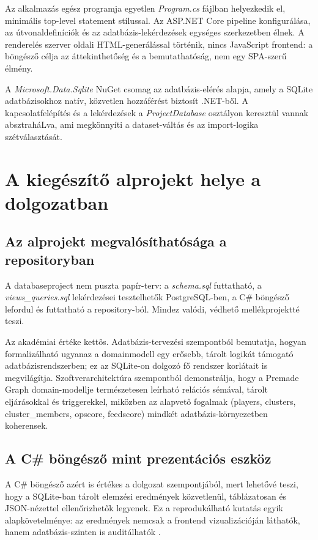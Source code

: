 Az alkalmazás egész programja egyetlen \textit{Program.cs} fájlban helyezkedik el, minimális top-level statement stílussal. Az ASP.NET Core pipeline konfigurálása, az útvonaldefiníciók és az adatbázis-lekérdezések egységes szerkezetben élnek. A renderelés szerver oldali HTML-generálással történik, nincs JavaScript frontend: a böngésző célja az áttekinthetőség és a bemutathatóság, nem egy SPA-szerű élmény.

A \textit{Microsoft.Data.Sqlite} NuGet csomag az adatbázis-elérés alapja, amely a SQLite adatbázisokhoz natív, közvetlen hozzáférést biztosít .NET-ből. A kapcsolatfelépítés és a lekérdezések a \textit{ProjectDatabase} osztályon keresztül vannak absztraháLva, ami megkönnyíti a dataset-váltás és az import-logika szétválasztását.

\section{A kiegészítő alprojekt helye a dolgozatban}

\subsection{Az alprojekt megvalósíthatósága a repositoryban}

A databaseproject nem puszta papír-terv: a \textit{schema.sql} futtatható, a \textit{views\_queries.sql} lekérdezései tesztelhetők PostgreSQL-ben, a C\# böngésző lefordul és futtatható a repository-ból. Mindez valódi, védhető mellékprojektté teszi.

Az akadémiai értéke kettős. Adatbázis-tervezési szempontból bemutatja, hogyan formalizálható ugyanaz a domainmodell egy erősebb, tárolt logikát támogató adatbázisrendszerben; ez az SQLite-on dolgozó fő rendszer korlátait is megvilágítja. Szoftverarchitektúra szempontból demonstrálja, hogy a Premade Graph domain-modellje természetesen leírható relációs sémával, tárolt eljárásokkal és triggerekkel, miközben az alapvető fogalmak (players, clusters, cluster\_members, opscore, feedscore) mindkét adatbázis-környezetben koherensek.

\subsection{A C\# böngésző mint prezentációs eszköz}

A C\# böngésző azért is értékes a dolgozat szempontjából, mert lehetővé teszi, hogy a SQLite-ban tárolt elemzési eredmények közvetlenül, táblázatosan és JSON-nézettel ellenőrizhetők legyenek. Ez a reprodukálható kutatás egyik alapkövetelménye: az eredmények nemcsak a frontend vizualizációján láthatók, hanem adatbázis-szinten is auditálhatók \cite{sandve2013}.

